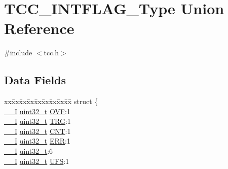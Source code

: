 \hypertarget{union_t_c_c___i_n_t_f_l_a_g___type}{}\section{T\+C\+C\+\_\+\+I\+N\+T\+F\+L\+A\+G\+\_\+\+Type Union Reference}
\label{union_t_c_c___i_n_t_f_l_a_g___type}


{\ttfamily \#include $<$tcc.\+h$>$}

\subsection*{Data Fields}
\begin{DoxyCompactItemize}
\item 
\begin{tabbing}
xx\=xx\=xx\=xx\=xx\=xx\=xx\=xx\=xx\=\kill
struct \{\\
\>\mbox{\hyperlink{core__cm0plus_8h_af63697ed9952cc71e1225efe205f6cd3}{\_\_I}} \mbox{\hyperlink{union_t_c_c___i_n_t_f_l_a_g___type_a7c2ec0f7b3f1314bdede58b182af397c}{uint32\_t}} \mbox{\hyperlink{union_t_c_c___i_n_t_f_l_a_g___type_a661ed6e1d21a6ca7e238db06b59ca3db}{OVF}}:1\\
\>\mbox{\hyperlink{core__cm0plus_8h_af63697ed9952cc71e1225efe205f6cd3}{\_\_I}} \mbox{\hyperlink{union_t_c_c___i_n_t_f_l_a_g___type_a7c2ec0f7b3f1314bdede58b182af397c}{uint32\_t}} \mbox{\hyperlink{union_t_c_c___i_n_t_f_l_a_g___type_a28944e122323901490bf08837e16f7c7}{TRG}}:1\\
\>\mbox{\hyperlink{core__cm0plus_8h_af63697ed9952cc71e1225efe205f6cd3}{\_\_I}} \mbox{\hyperlink{union_t_c_c___i_n_t_f_l_a_g___type_a7c2ec0f7b3f1314bdede58b182af397c}{uint32\_t}} \mbox{\hyperlink{union_t_c_c___i_n_t_f_l_a_g___type_a5a2def14363813fcf6287e3edd1104bf}{CNT}}:1\\
\>\mbox{\hyperlink{core__cm0plus_8h_af63697ed9952cc71e1225efe205f6cd3}{\_\_I}} \mbox{\hyperlink{union_t_c_c___i_n_t_f_l_a_g___type_a7c2ec0f7b3f1314bdede58b182af397c}{uint32\_t}} \mbox{\hyperlink{union_t_c_c___i_n_t_f_l_a_g___type_af6882b2088feac98419f8c0ae5ab32ea}{ERR}}:1\\
\>\mbox{\hyperlink{core__cm0plus_8h_af63697ed9952cc71e1225efe205f6cd3}{\_\_I}} \mbox{\hyperlink{union_t_c_c___i_n_t_f_l_a_g___type_a7c2ec0f7b3f1314bdede58b182af397c}{uint32\_t}}:6\\
\>\mbox{\hyperlink{core__cm0plus_8h_af63697ed9952cc71e1225efe205f6cd3}{\_\_I}} \mbox{\hyperlink{union_t_c_c___i_n_t_f_l_a_g___type_a7c2ec0f7b3f1314bdede58b182af397c}{uint32\_t}} \mbox{\hyperlink{union_t_c_c___i_n_t_f_l_a_g___type_a8834d9814b29e352a1eef8c6350ba159}{UFS}}:1\\

\end{tabbing}
\end{DoxyCompactItemize}
